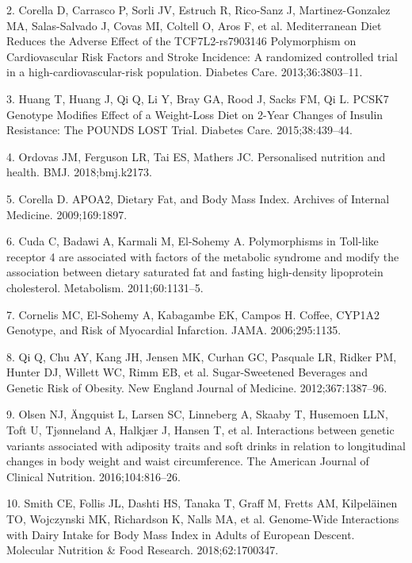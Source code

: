 \documentclass[]{article}
\begin{document}
\leavevmode\hypertarget{ref-Corella2013}{}%
2. Corella D, Carrasco P, Sorli JV, Estruch R, Rico-Sanz J,
Martinez-Gonzalez MA, Salas-Salvado J, Covas MI, Coltell O, Aros F, et
al. Mediterranean Diet Reduces the Adverse Effect of the
TCF7L2-rs7903146 Polymorphism on Cardiovascular Risk Factors and Stroke
Incidence: A randomized controlled trial in a high-cardiovascular-risk
population. Diabetes Care. 2013;36:3803--11.

\leavevmode\hypertarget{ref-Huang2015}{}%
3. Huang T, Huang J, Qi Q, Li Y, Bray GA, Rood J, Sacks FM, Qi L. PCSK7
Genotype Modifies Effect of a Weight-Loss Diet on 2-Year Changes of
Insulin Resistance: The POUNDS LOST Trial. Diabetes Care.
2015;38:439--44.

\leavevmode\hypertarget{ref-Ordovas2018}{}%
4. Ordovas JM, Ferguson LR, Tai ES, Mathers JC. Personalised nutrition
and health. BMJ. 2018;bmj.k2173.

\leavevmode\hypertarget{ref-Corella2009}{}%
5. Corella D. APOA2, Dietary Fat, and Body Mass Index. Archives of
Internal Medicine. 2009;169:1897.

\leavevmode\hypertarget{ref-Cuda2011}{}%
6. Cuda C, Badawi A, Karmali M, El-Sohemy A. Polymorphisms in Toll-like
receptor 4 are associated with factors of the metabolic syndrome and
modify the association between dietary saturated fat and fasting
high-density lipoprotein cholesterol. Metabolism. 2011;60:1131--5.

\leavevmode\hypertarget{ref-Cornelis2006}{}%
7. Cornelis MC, El-Sohemy A, Kabagambe EK, Campos H. Coffee, CYP1A2
Genotype, and Risk of Myocardial Infarction. JAMA. 2006;295:1135.

\leavevmode\hypertarget{ref-Qi2012}{}%
8. Qi Q, Chu AY, Kang JH, Jensen MK, Curhan GC, Pasquale LR, Ridker PM,
Hunter DJ, Willett WC, Rimm EB, et al. Sugar-Sweetened Beverages and
Genetic Risk of Obesity. New England Journal of Medicine.
2012;367:1387--96.

\leavevmode\hypertarget{ref-Olsen2016}{}%
9. Olsen NJ, Ängquist L, Larsen SC, Linneberg A, Skaaby T, Husemoen LLN,
Toft U, Tjønneland A, Halkjær J, Hansen T, et al. Interactions between
genetic variants associated with adiposity traits and soft drinks in
relation to longitudinal changes in body weight and waist circumference.
The American Journal of Clinical Nutrition. 2016;104:816--26.

\leavevmode\hypertarget{ref-Smith2018}{}%
10. Smith CE, Follis JL, Dashti HS, Tanaka T, Graff M, Fretts AM,
Kilpeläinen TO, Wojczynski MK, Richardson K, Nalls MA, et al.
Genome-Wide Interactions with Dairy Intake for Body Mass Index in Adults
of European Descent. Molecular Nutrition \& Food Research.
2018;62:1700347.
\end{document}
